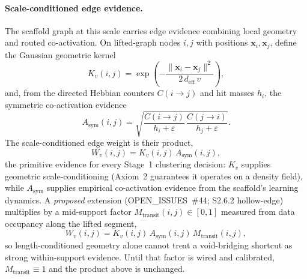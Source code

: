 \documentclass[11pt]{article}
\begin{document}
\paragraph{Scale-conditioned edge evidence.}
The scaffold graph at this scale carries edge evidence combining local geometry
and routed co-activation. On lifted-graph nodes $i,j$ with positions
$\mathbf x_i,\mathbf x_j$, define the Gaussian geometric kernel
\[
K_v(i,j)=\exp\!\left(-\frac{\lVert\mathbf x_i-\mathbf x_j\rVert^2}
{2\,d_{\mathrm{eff}}\,v}\right),
\]
and, from the directed Hebbian counters $C(i\to j)$ and hit masses $h_i$, the
symmetric co-activation evidence
\[
A_{\mathrm{sym}}(i,j)=\sqrt{\frac{C(i\to j)}{h_i+\varepsilon}\,
\frac{C(j\to i)}{h_j+\varepsilon}}.
\]
The scale-conditioned edge weight is their product,
\[
W_v(i,j)=K_v(i,j)\,A_{\mathrm{sym}}(i,j),
\]
the primitive evidence for every Stage~1 clustering decision: $K_v$ supplies
geometric scale-conditioning (Axiom~2 guarantees it operates on a density
field), while $A_{\mathrm{sym}}$ supplies empirical co-activation evidence from
the scaffold's learning dynamics. A \emph{proposed} extension (OPEN\_ISSUES~\#44;
S2.6.2 hollow-edge) multiplies by a mid-support factor
$M_{\mathrm{transit}}(i,j)\in[0,1]$ measured from data occupancy along the
lifted segment,
\[
W_v(i,j)=K_v(i,j)\,A_{\mathrm{sym}}(i,j)\,M_{\mathrm{transit}}(i,j),
\]
so length-conditioned geometry alone cannot treat a void-bridging shortcut as
strong within-support evidence. Until that factor is wired and calibrated,
$M_{\mathrm{transit}}\equiv 1$ and the product above is unchanged.
\end{document}
